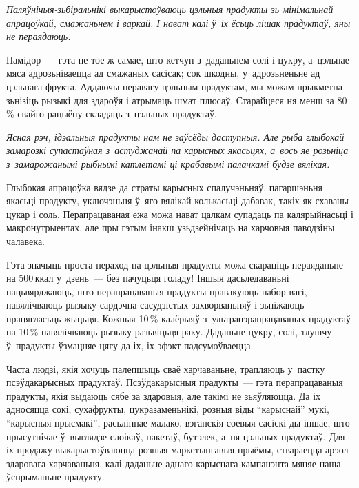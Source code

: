 \emph{Паляўнічыя-зьбіральнікі выкарыстоўваюць цэльныя прадукты зь мінімальнай апрацоўкай, смажаньнем і варкай. І нават калі ў~іх ёсьць лішак прадуктаў, яны не пераядаюць.}

Памідор~--- гэта не тое ж самае, што кетчуп з~даданьнем солі і цукру, а~цэльнае мяса адрозьніваецца ад смажаных сасісак; сок шкодны, у~адрозьненьне ад цэльнага фрукта. Аддаючы перавагу цэльным прадуктам, мы можам прыкметна зьнізіць рызыкі для здароўя і атрымаць шмат плюсаў. Старайцеся ня менш за 80\,\% свайго рацыёну складаць з~цэльных прадуктаў.

\emph{Ясная рэч, ідэальныя прадукты нам не заўсёды даступныя. Але рыба глыбокай замарозкі супастаўная з~астуджанай па карысных якасьцях, а~вось яе розьніца з~замарожанымі рыбнымі катлетамі ці крабавымі палачкамі будзе вялікая.}

Глыбокая апрацоўка вядзе да страты карысных спалучэньняў, пагаршэньня якасьці прадукту, уключэньня ў~яго вялікай колькасьці дабавак, такіх як схаваны цукар і соль. Перапрацаваная ежа можа нават цалкам супадаць па калярыйнасьці і макронутрыентах, але пры гэтым інакш узьдзейнічаць на харчовыя паводзіны чалавека.


Гэта значыць проста пераход на цэльныя прадукты можа скараціць пераяданьне на 500\,ккал у~дзень~--- без пачуцьця голаду! Іншыя дасьледаваньні пацьвярджаюць, што перапрацаваныя прадукты правакуюць набор вагі, павялічваюць рызыку сардэчна-сасудзістых захворваньняў і зьніжаюць працягласьць жыцьця. Кожныя 10\,\% калёрыяў з~ультрапэрапрацаваных прадуктаў на 10\,\% павялічваюць рызыку разьвіцьця раку. Даданьне цукру, солі, тлушчу ў~прадукты ўзмацняе цягу да іх, іх эфэкт падсумоўваецца.

Часта людзі, якія хочуць палепшыць сваё харчаваньне, трапляюць у~пастку псэўдакарысных прадуктаў. Псэўдакарысныя прадукты~--- гэта перапрацаваныя прадукты, якія выдаюць сябе за здаровыя, але такімі не зьяўляюцца. Да іх адносяцца сокі, сухафрукты, цукразаменьнікі, розныя віды ``карыснай'' мукі, ``карысныя прысмакі'', расьліннае малако, вэганскія соевыя сасіскі ды іншае, што прысутнічае ў~выглядзе слоікаў, пакетаў, бутэлек, а~ня цэльных прадуктаў. Для іх продажу выкарыстоўваюцца розныя маркетынгавыя прыёмы, ствараецца арэол здаровага харчаваньня, калі даданьне аднаго карыснага кампанэнта мяняе наша ўспрыманьне прадукту.


